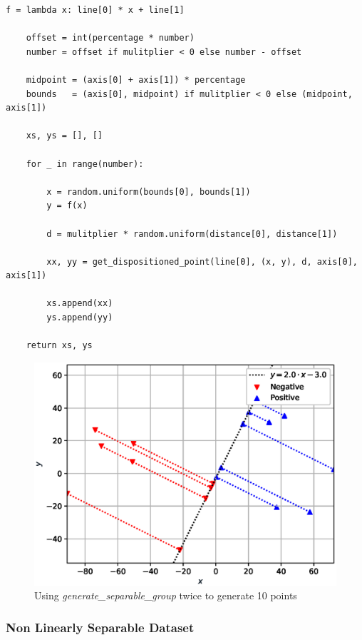 \documentclass[12pt]{article}
\newenvironment{matlab}
	{\begin{figure}[H]\centering\captionsetup{justification=centering}}
	{\end{figure}}
\begin{document}
\begin{lstlisting}[caption={Η μέθοδος \textit{generate\_separable\_group}}]
    f = lambda x: line[0] * x + line[1]

    offset = int(percentage * number)
    number = offset if mulitplier < 0 else number - offset

    midpoint = (axis[0] + axis[1]) * percentage
    bounds   = (axis[0], midpoint) if mulitplier < 0 else (midpoint, axis[1])

    xs, ys = [], []

    for _ in range(number):

        x = random.uniform(bounds[0], bounds[1])
        y = f(x)

        d = mulitplier * random.uniform(distance[0], distance[1])

        xx, yy = get_dispositioned_point(line[0], (x, y), d, axis[0], axis[1])

        xs.append(xx)
        ys.append(yy)

    return xs, ys
\end{lstlisting}

\begin{matlab}
    \includegraphics[scale=0.75]{figures/perpendicular}
    \caption{Using \textit{generate\_separable\_group} twice to generate 10 points }
\end{matlab}

\subsubsection{Non Linearly Separable Dataset}
\end{document}
